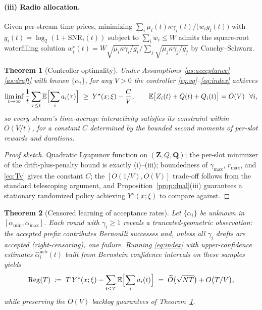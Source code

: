 \documentclass[11pt]{article}
\newtheorem{theorem}{Theorem}
\theoremstyle{definition}
\theoremstyle{remark}
\newcommand{\E}{\mathbb{E}}
\begin{document}
\paragraph{(iii) Radio allocation.}
Given per-stream time prices, minimizing
$\sum_i\mu_i(t)\kappa\gamma_i(t)/\bigl(w_i g_i(t)\bigr)$ with
$g_i(t)=\log_2(1+\mathrm{SNR}_i(t))$ subject to $\sum_i w_i\le W$ admits the
square-root waterfilling solution
$w_i^{\star}(t)=W\sqrt{\mu_i\kappa\gamma_i/g_i}\big/
\sum_{j}\sqrt{\mu_j\kappa\gamma_j/g_j}$ by Cauchy--Schwarz.

\begin{theorem}[Controller optimality]\label{thm:dpp}
Under Assumptions~\ref{as:acceptance}--\ref{as:draft} with known
$\{\alpha_i\}$, for any $V>0$ the controller
\eqref{eq:vq}--\eqref{eq:index} achieves
\begin{equation}\label{eq:dppbound}
\liminf_{t\to\infty}\frac{1}{t}\sum_{\tau\le t}\E\Bigl[\sum_i a_i(\tau)\Bigr]
\;\ge\;Y^{\star}(x;\xi)-\frac{C}{V},
\qquad
\E\bigl[Z_i(t)+Q(t)+Q_i(t)\bigr]=O(V)\ \ \forall i,
\end{equation}
so every stream's time-average interactivity satisfies its constraint within
$O(V/t)$, for a constant $C$ determined by the bounded second moments of
per-slot rewards and durations.
\end{theorem}

\begin{proof}[Proof sketch]
Quadratic Lyapunov function on $(\mathbf{Z},Q,\mathbf{Q})$; the per-slot
minimizer of the drift-plus-penalty bound is exactly
(i)--(iii); boundedness of $\gamma_{\max}$, $r_{\max}$, and \eqref{eq:Tv}
gives the constant $C$; the $[O(1/V),O(V)]$ trade-off follows from the
standard telescoping argument, and Proposition~\ref{prop:dual}(iii)
guarantees a stationary randomized policy achieving $Y^{\star}(x;\xi)$ to
compare against.
\end{proof}

\begin{theorem}[Censored learning of acceptance rates]\label{thm:learning}
Let $\{\alpha_i\}$ be unknown in $[\alpha_{\min},\alpha_{\max}]$. Each round
with $\gamma_i\ge1$ reveals a truncated-geometric observation: the accepted
prefix contributes Bernoulli successes and, unless all $\gamma_i$ drafts are
accepted (right-censoring), one failure. Running \eqref{eq:index} with
upper-confidence estimates $\hat{\alpha}_i^{\mathrm{ucb}}(t)$ built from
Bernstein confidence intervals on these samples yields
\begin{equation}\label{eq:regret}
\mathrm{Reg}(T)\;\coloneqq\;T\,Y^{\star}(x;\xi)
-\sum_{t\le T}\E\Bigl[\sum_i a_i(t)\Bigr]
\;=\;\widetilde{O}\bigl(\sqrt{NT}\bigr)+O\bigl(T/V\bigr),
\end{equation}
while preserving the $O(V)$ backlog guarantees of Theorem~\ref{thm:dpp}.
\end{theorem}
\end{document}
